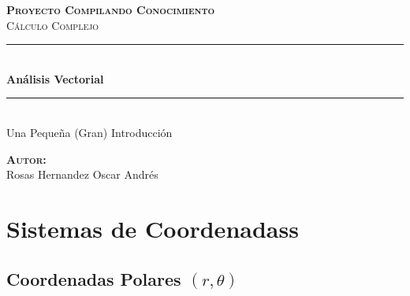 \documentclass[12pt, fleqn]{report}                             %
\author{Oscar Andrés Rosas}                                     %
\begin{document}
\begin{titlepage}

	\center
	\textbf{\textsc{\Large Proyecto Compilando Conocimiento}}\\[1.0cm] 
	\textsc{\Large Cálculo Complejo}\\[1.0cm] 

	\rule{\linewidth}{0.5mm} \\[1.0cm]
		{ \huge \bfseries Análisis Vectorial}\\[1.0cm] 
	\rule{\linewidth}{0.5mm} \\[2.0cm]
	
	{\LARGE Una Pequeña (Gran) Introducción}\\[7cm] 
	
	\begin{center} \large
	\textbf{\textsc{Autor:}}\\
	Rosas Hernandez Oscar Andrés
	\end{center}

	\vfill

\end{titlepage}

\tableofcontents{}
\label{sec:Index}

\clearpage




\part{Sistemas de Coordenadass}
\clearpage


    \chapter{Coordenadas Polares $(r, \theta)$}
\end{document}
